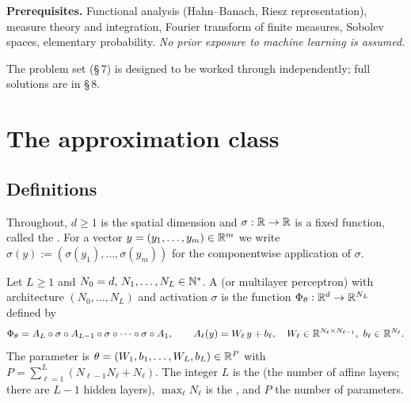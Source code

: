 \documentclass[11pt,a4paper]{article}
\begin{document}

\vspace{6pt}

\begin{keybox}
\textbf{Prerequisites.} Functional analysis (Hahn--Banach, Riesz representation), measure theory and
integration, Fourier transform of finite measures, Sobolev spaces, elementary probability.
\emph{No prior exposure to machine learning is assumed.}

\smallskip
The problem set (§\,7) is designed to be worked through independently; full solutions are in §\,8.
\end{keybox}

\bigskip

\newpage
\tableofcontents
\newpage

\section{The approximation class}

\subsection{Definitions}

Throughout, $d \ge 1$ is the spatial dimension and $\sigma : \mathbb{R} \to \mathbb{R}$ is a fixed function, called
the . For a vector $y = (y_1,\dots,y_m) \in \mathbb{R}^m$ we write
$\sigma(y) := (\sigma(y_1),\dots,\sigma(y_m))$ for the componentwise application of $\sigma$.

\begin{definition}\label{def:mlp}
Let $L \ge 1$ and $N_0 = d,\, N_1,\dots,N_L \in \mathbb{N}^*$. A  (or multilayer
perceptron) with architecture $(N_0,\dots,N_L)$ and activation $\sigma$ is the function
$\Phi_\theta : \mathbb{R}^d \to \mathbb{R}^{N_L}$ defined by
\[
\Phi_\theta = A_L \circ \sigma \circ A_{L-1} \circ \sigma \circ \cdots \circ \sigma \circ A_1,
\qquad
A_\ell(y) = W_\ell\, y + b_\ell,\quad W_\ell \in \mathbb{R}^{N_\ell \times N_{\ell-1}},\ b_\ell \in \mathbb{R}^{N_\ell}.
\]
The parameter is $\theta = (W_1,b_1,\dots,W_L,b_L) \in \mathbb{R}^{P}$ with
$P = \sum_{\ell=1}^L (N_{\ell-1}N_\ell + N_\ell)$. The integer $L$ is the  (the number of
affine layers; there are $L-1$ hidden layers), $\max_\ell N_\ell$ is the , and $P$ the
number of parameters.
\end{definition}
\end{document}
